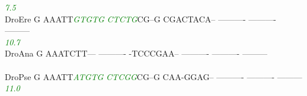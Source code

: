 \documentclass[11pt,twoside,reqno,a4paper]{article}
\begin{document}
{\hspace*{7\charwidth}\hspace*{1\charwidth}\hspace*{6\charwidth}\textit{\textcolor{Green}{7.5}}\hspace*{1\charwidth}\hspace*{1\charwidth}\hspace*{1\charwidth}\hspace*{1\charwidth}\hspace*{1\charwidth}\\
DroEre	G	AAATT\textit{\textcolor{Green}{G}}\textit{\textcolor{Green}{T}}\textit{\textcolor{Green}{G}}\textit{\textcolor{Green}{T}}\textit{\textcolor{Green}{G}}	\textit{\textcolor{Green}{C}}\textit{\textcolor{Green}{T}}\textit{\textcolor{Green}{C}}\textit{\textcolor{Green}{T}}\textit{\textcolor{Green}{G}}CG--G	CGACTACA--	----------	----------	---------\\
\hspace*{7\charwidth}\hspace*{1\charwidth}\hspace*{6\charwidth}\textit{\textcolor{Green}{10.7}}\hspace*{1\charwidth}\hspace*{1\charwidth}\hspace*{1\charwidth}\hspace*{1\charwidth}\hspace*{1\charwidth}\\
DroAna	G	AAATCTT---	----------	-TCCCGAA--	----------	----------	---------\\
\hspace*{7\charwidth}\hspace*{1\charwidth}\hspace*{1\charwidth}\hspace*{1\charwidth}\hspace*{1\charwidth}\hspace*{1\charwidth}\hspace*{1\charwidth}\\
DroPse	G	AAATT\textit{\textcolor{Green}{A}}\textit{\textcolor{Green}{T}}\textit{\textcolor{Green}{G}}\textit{\textcolor{Green}{T}}\textit{\textcolor{Green}{G}}	\textit{\textcolor{Green}{C}}\textit{\textcolor{Green}{T}}\textit{\textcolor{Green}{C}}\textit{\textcolor{Green}{G}}\textit{\textcolor{Green}{G}}CG--G	CAA-GGAG--	----------	----------	---------\\
\hspace*{7\charwidth}\hspace*{1\charwidth}\hspace*{6\charwidth}\textit{\textcolor{Green}{11.0}}\hspace*{1\charwidth}\hspace*{1\charwidth}\hspace*{1\charwidth}\hspace*{1\charwidth}\hspace*{1\charwidth}\\
}
\end{document}
